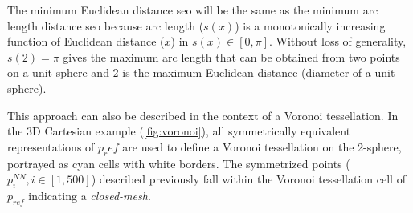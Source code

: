 \documentclass[preprint,12pt]{elsarticle}
\begin{document}
The minimum Euclidean distance \gls{seo} will be the same as the minimum arc length distance \gls{seo} because arc length ($s(x)$) is a monotonically increasing function of Euclidean distance ($x$) in $s(x)\in[0,\pi]$. Without loss of generality, $s(2)=\pi$ gives the maximum arc length that can be obtained from two points on a unit-sphere and $2$ is the maximum Euclidean distance (diameter of a unit-sphere).

This approach can also be described in the context of a Voronoi tessellation. In the 3D Cartesian example (\cref{fig:voronoi}), all symmetrically equivalent representations of $p_ref$ are used to define a Voronoi tessellation on the 2-sphere, portrayed as cyan cells with white borders. The symmetrized points ($p^{NN}_i,i\in[1,500]$) described previously fall within the Voronoi tessellation cell of $p_{ref}$ indicating a \textit{closed-mesh}.
\end{document}
